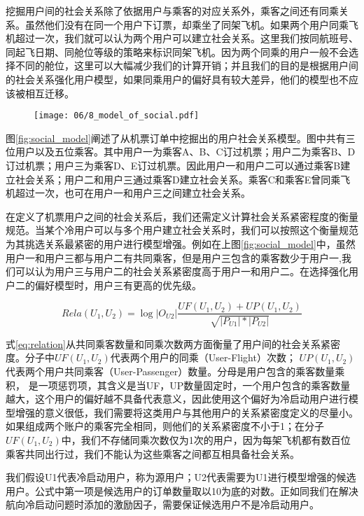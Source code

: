 挖掘用户间的社会关系除了依据用户与乘客的对应关系外，乘客之间还有同乘关系。虽然他们没有在同一个用户下订票，却乘坐了同架飞机。如果两个用户同乘飞机超过一次，我们就可以认为两个用户可以建立社会关系。这里我们按同航班号、同起飞日期、同舱位等级的策略来标识同架飞机。因为两个同乘的用户一般不会选择不同的舱位，这里可以大幅减少我们的计算开销；并且我们的目的是根据用户间的社会关系强化用户模型，如果同乘用户的偏好具有较大差异，他们的模型也不应该被相互迁移。

\begin{figure}[!h]
 \centering
 \texttt{[image: 06/8\_model\_of\_social.pdf]}
\end{figure}

图\ref{fig:social_model}阐述了从机票订单中挖掘出的用户社会关系模型。图中共有三位用户以及五位乘客。其中用户一为乘客A、B、C订过机票；用户二为乘客B、D订过机票；用户三为乘客D、E订过机票。因此用户一和用户二可以通过乘客B建立社会关系；用户二和用户三通过乘客D建立社会关系。乘客C和乘客E曾同乘飞机超过一次，也可在用户一和用户三之间建立社会关系。

在定义了机票用户之间的社会关系后，我们还需定义计算社会关系紧密程度的衡量规范。当某个冷用户可以与多个用户建立社会关系时，我们可以按照这个衡量规范为其挑选关系最紧密的用户进行模型增强。例如在上图\ref{fig:social_model}中，虽然用户一和用户三都与用户二有共同乘客，但是用户三包含的乘客数少于用户一,我们可以认为用户三与用户二的社会关系紧密度高于用户一和用户二。在选择强化用户二的偏好模型时，用户三有更高的优先级。

\begin{equation}
\label{eq:relation}
	Rela(U_1,U_2) = \log|O_{U2}| \frac{UF(U_1,U_2) + UP(U_1,U_2)}{\sqrt{|P_{U1}|*|P_{U2}|}}
\end{equation}

式\ref{eq:relation}从共同乘客数量和同乘次数两方面衡量了用户间的社会关系紧密度。分子中$UF(U_1,U_2)$代表两个用户的同乘（User-Flight）次数；
$UP(U_1,U_2)$代表两个用户共同乘客（User-Passenger）数量。分母是用户包含的乘客数量乘积，
是一项惩罚项，其含义是当UF，UP数量固定时，一个用户包含的乘客数量越大，这个用户的偏好越不具备代表意义，因此使用这个偏好为冷启动用户进行模型增强的意义很低，我们需要将这类用户与其他用户的关系紧密度定义的尽量小。如果组成两个账户的乘客完全相同，则他们的关系紧密度不小于1；在分子$UF(U_1,U_2)$中，我们不存储同乘次数仅为1次的用户，因为每架飞机都有数百位乘客共同出行过，我们不能认为这些乘客之间都互相具备社会关系。

我们假设U1代表冷启动用户，称为源用户；U2代表需要为U1进行模型增强的候选用户。公式中第一项是候选用户的订单数量取以10为底的对数。正如同我们在解决航向冷启动问题时添加的激励因子，需要保证候选用户不是冷启动用户。

